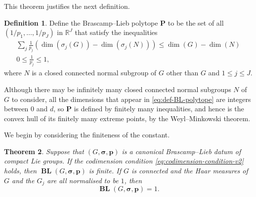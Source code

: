 \documentclass[12pt,twoside,a4paper]{amsart}
\newtheorem{thm}{Theorem}[section]
\theoremstyle{definition}
\newtheorem{defn}[thm]{Definition}%
\theoremstyle{remark}
\numberwithin{equation}{section}
\newcommand{\R}{\mathbb{R}}
\newcommand{\sfrac}[2]{#1 / #2}
\newcommand{\BL}{\operatorname{\mathbf{BL}}}
\newcommand{\bss}{\boldsymbol{\sigma}}
\newcommand{\Polytope}{\boldsymbol{P}}
\newcommand{\bsp}{\boldsymbol{p}}
\newcommand{\lpar}{\left( }
\newcommand{\rpar}{\right) }
\begin{document}
This theorem justifies the next definition.

\begin{defn}
Define the Brascamp--Lieb polytope $\Polytope$ to be the set of all 
$(\sfrac{1}{p_1}, \dots , \sfrac{1}{p_J})$ in $\R^J$ that satisfy the inequalities
\begin{equation}\label{eq:def-BL-polytope}
\begin{gathered}
\sum_j \frac{1}{p_j} \lpar \dim(\sigma_j(G))  - \dim( \sigma_j (N) ) \rpar  \leq \dim(G) - \dim(N) 
\\
0 \leq \frac{1}{p_j} \leq 1 ,
\end{gathered}
\end{equation}
where $N$ is a closed connected normal subgroup of $G$ other than $G$ and $1 \leq j \leq J$.
\end{defn}

Although there may be infinitely many closed connected normal subgroups $N$ of $G$ to consider, all the dimensions that appear in \eqref{eq:def-BL-polytope} are integers between $0$ and $d$, so $\Polytope$ is defined by finitely many inequalities, and hence is the convex hull of its finitely many extreme points, by the Weyl--Minkowski theorem.

We begin by considering the finiteness of the constant.


\begin{thm}\label{thm:codim-cond-implies-BL}
Suppose that $(G, \bss,\bsp)$ is a canonical Brascamp--Lieb datum of compact Lie groups.
If the codimension condition \eqref{eq:codimension-condition-v2} holds, then $\BL(G, \bss, \bsp)$ is finite.
If $G$ is connected and the Haar measures of $G$ and the $G_j$ are all normalised to be $1$, then 
\[
\BL(G, \bss, \bsp)=1.
\]
\end{thm}
\end{document}
